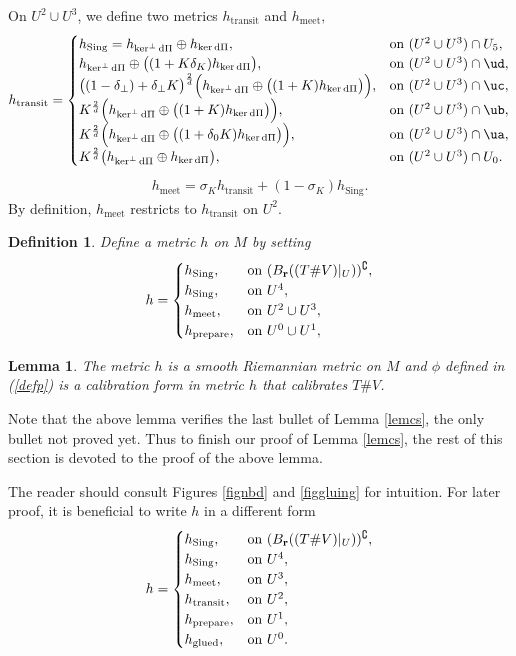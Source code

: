 \documentclass[11pt,a4paper]{amsart}
\numberwithin{equation}{section}
\newcommand{\hgd}{h_{\operatorname{glued}}}
\newcommand{\htt}{h_{\operatorname{transit}}}
\newcommand{\hpp}{h_{\operatorname{prepare}}}
\newcommand{\hmt}{h_{\operatorname{meet}}}
\newcommand{\sing}{{\operatorname{Sing}}}
\newcommand{\de}{\delta}
\newcommand{\si}{\sigma}
\newcommand{\cp}{^\complement}
\newcommand{\ed}{{\operatorname{d}}}
\newcommand{\hkp}{h_{\ker \ed\Pi}}
\newcommand{\hkn}{h_{\ker^\perp \ed\Pi}}
\newcommand{\mfr}{{\mathbf{r}}}
\newcommand{\tvu}{(T\#V)|_U}
\newcommand{\ur}{B_{\mfr}(\tvu)}
\theoremstyle{plain}
\newtheorem{lem}[exam]{Lemma}
\newtheorem{defn}[exam]{Definition}
\theoremstyle{definition}
\numberwithin{equation}{subsection}
\begin{document}
	
	On $U^2\cup U^3$, we define two metrics $\htt$ and $\hmt,$
	\begin{align}\htt=
		\begin{cases}
			h_\sing=\hkn\oplus \hkp,&\text{on }(U^2\cup U^3)\cap U_5,\\
			\hkn\oplus \big((1+K\de_K)\hkp\big),&\text{on }{(U^2\cup U^3)\cap\ud},\\
			\big((1-\de_\perp)+\de_\perp K\big)^{\frac{2}{d}}\Big(\hkn\oplus \big((1+K)\hkp\big)\Big),&\text{on }{(U^2\cup U^3)\cap\uc},\\
			K^{\frac{2}{d}}\Big(\hkn\oplus \big((1+K)\hkp\big)\Big),&\text{on }{(U^2\cup U^3)\cap\ub},\\
			K^{\frac{2}{d}}\Big(\hkn\oplus \big((1+\de_0 K)\hkp\big)\Big),&\text{on }{(U^2\cup U^3)\cap\ua},\\
			K^{\frac{2}{d}}\big(\hkn\oplus \hkp\big),&\text{on }(U^2\cup U^3)\cap U_0.				
		\end{cases}
	\end{align}
	\begin{align}\hmt=\si_K \htt+(1-\si_K)h_\sing.
	\end{align}
	By definition, $\hmt$ restricts to $\htt$ on $U^2.$
	\begin{defn}\label{defnh}
		Define a metric $h$ on $M$ by setting
		\begin{align*}
			h=\begin{cases}
				h_\sing,&\textnormal{on }(\ur)\cp,\\
				h_\sing,&\textnormal{on }U^4,\\
				\hmt	,&\textnormal{on }U^2\cup U^3,\\
				\hpp	,&\textnormal{on }U^0\cup U^1,		\end{cases}
		\end{align*}
	\end{defn}
	\begin{lem}\label{hgdc}
		The metric $h$	is a smooth Riemannian metric on $M$ and $\phi$ defined in (\ref{defp}) is a calibration form in metric $h$ that calibrates $T\#V$. 
	\end{lem}
	Note that the above lemma verifies the last bullet of Lemma \ref{lemcs}, the only bullet not proved yet. Thus to finish our proof of Lemma \ref{lemcs}, the rest of this section is devoted to the proof of the above lemma.
	
	The reader should consult Figures \ref{fignbd} and \ref{figgluing} for intuition. For later proof, it is beneficial to write $h$ in a different form
	\begin{align}\label{defnhc}
		h=\begin{cases}
			h_\sing,&\textnormal{on }(\ur)\cp,\\
			h_\sing,&\textnormal{on }U^4,\\
			\hmt	,&\textnormal{on }U^3,\\
			\htt	,&\textnormal{on }U^2,\\
			\hpp	,&\textnormal{on }U^1,\\
			\hgd	,&\textnormal{on }U^0.		\end{cases}
	\end{align}
\end{document}
